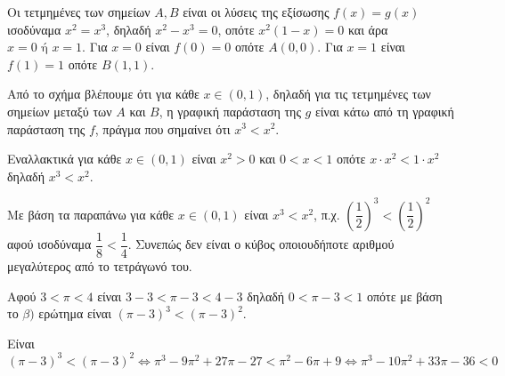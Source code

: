 
\begin{alist}
\item Οι τετμημένες των σημείων $A, B$ είναι οι λύσεις της εξίσωσης $f(x) = g(x)$ ισοδύναμα
$x^2 = x^3$, δηλαδή $x^2 - x^3 = 0$, οπότε $x^2(1 - x) = 0$ και άρα $x = 0 \text{ ή } x = 1$.
Για $x = 0$ είναι $f(0) = 0$ οπότε $A(0, 0)$.
Για $x = 1$ είναι $f(1) = 1$ οπότε $B(1, 1)$.

\item Από το σχήμα βλέπουμε ότι για κάθε $x \in (0, 1)$, δηλαδή για τις τετμημένες των
σημείων μεταξύ των $A$ και $B$, η γραφική παράσταση της $g$ είναι κάτω από τη
γραφική παράσταση της $f$, πράγμα που σημαίνει ότι $x^3 < x^2$.

Εναλλακτικά για κάθε $x \in (0, 1)$ είναι $x^2 > 0$ και $0 < x < 1$ οπότε $x \cdot x^2 < 1 \cdot x^2$ δηλαδή
$x^3 < x^2$.

\item Με βάση τα παραπάνω για κάθε $x \in (0, 1)$ είναι $x^3 < x^2$, π.χ. $\left(\dfrac{1}{2}\right)^3 < \left(\dfrac{1}{2}\right)^2$ αφού
ισοδύναμα $\dfrac{1}{8} < \dfrac{1}{4}$. Συνεπώς δεν είναι ο κύβος οποιουδήποτε αριθμού μεγαλύτερος
από το τετράγωνό του.

\item 
\begin{rlist}
\item Αφού $3 < \pi < 4$ είναι $3 - 3 < \pi - 3 < 4 - 3$ δηλαδή $0 < \pi - 3 < 1$ οπότε με βάση το 
$\beta)$ ερώτημα είναι $(\pi - 3)^3 < (\pi - 3)^2$.
\item Είναι
\[(\pi - 3)^3 < (\pi - 3)^2 \Leftrightarrow \pi^3 - 9\pi^2 + 27\pi - 27 < \pi^2 - 6\pi + 9 \Leftrightarrow \pi^3 - 10\pi^2 + 33\pi - 36 < 0\]
\end{rlist}
\end{alist}

